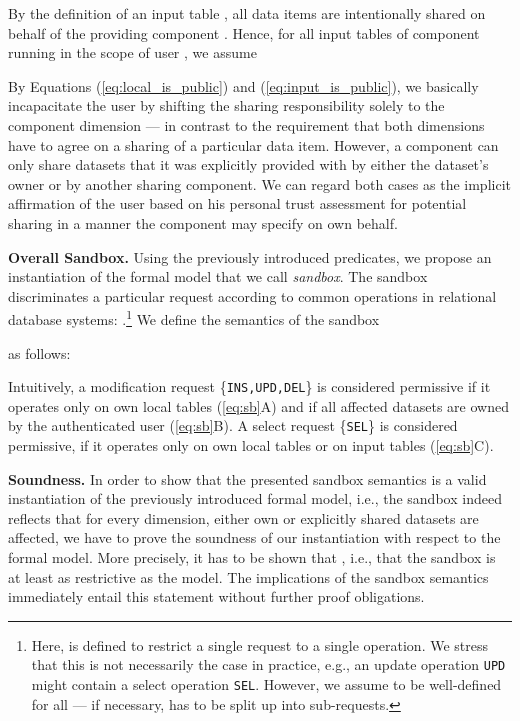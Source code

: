 \documentclass{src/acm_proc_article-sp} \else
\newcommand\myparagraph[1]{\medskip\noindent\textbf{#1.}}
\begin{document}
By the definition of an input table , all data items  are intentionally shared on behalf of the providing
component . Hence, for all input tables of component
 running in the scope of user , we assume



By Equations (\ref{eq:local_is_public}) and (\ref{eq:input_is_public}), we basically incapacitate the user by shifting the sharing responsibility solely to the component dimension --- in contrast to the requirement that both dimensions have to agree on a sharing of a particular data item.
However, a component can only share datasets that it was explicitly provided with by either the dataset's owner or by another sharing component. We can regard both cases as the implicit affirmation of the user based on his personal trust assessment for potential sharing in a manner the component may specify on own behalf.


\myparagraph{Overall Sandbox}
Using the previously introduced predicates, we propose an
instantiation of the formal model that we call \emph{sandbox}. The
sandbox  discriminates a particular request according to
common operations in relational database systems:
.\footnote{Here,  is defined to restrict a single request to a
single operation. We stress that this is not necessarily the case in
practice, e.g., an update operation \texttt{UPD} might contain a
select operation \texttt{SEL}.
However, we assume
 to be well-defined for all  --- if
necessary,  has to be split up into sub-requests.}
We define the semantics of the sandbox

as follows: 

Intuitively, a modification request \{\texttt{INS,UPD,DEL}\} is
considered permissive if it operates only on own local tables
(\ref{eq:sb}A) and if all affected datasets are owned by the
authenticated user (\ref{eq:sb}B). A select request \{\texttt{SEL}\}
is considered permissive, if it operates only on own local tables or
on input tables (\ref{eq:sb}C).


\myparagraph{Soundness}
In order to show that the presented sandbox semantics is a valid
instantiation of the previously introduced formal model, i.e., the
sandbox indeed reflects that for every dimension, either own or
explicitly shared datasets are affected, we have to prove the
soundness of our instantiation with respect to the formal model.
More precisely, it has to be shown that , i.e., that the sandbox
is at least as restrictive as the model. The implications of the
sandbox semantics immediately entail this statement without further
proof obligations.
\end{document}
